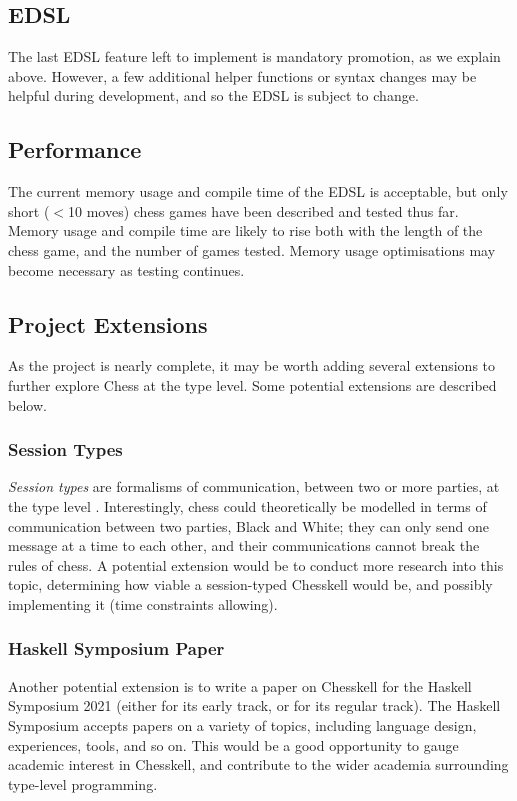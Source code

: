 \documentclass[12pt, a4paper, bibliography=totocnumbered]{scrartcl}
\begin{document}
\subsection{EDSL}

The last EDSL feature left to implement is mandatory promotion, as we explain above. However, a few additional helper functions or syntax changes may be helpful during development, and so the EDSL is subject to change.

\subsection{Performance}

The current memory usage and compile time of the EDSL is acceptable, but only short ($<$10 moves) chess games have been described and tested thus far. Memory usage and compile time are likely to rise both with the length of the chess game, and the number of games tested. Memory usage optimisations may become necessary as testing continues.

\subsection{Project Extensions}

As the project is nearly complete, it may be worth adding several extensions to further explore Chess at the type level. Some potential extensions are described below.

\subsubsection{Session Types}

\emph{Session types} are formalisms of communication, between two or more parties, at the type level \cite{torinosessions}. Interestingly, chess could theoretically be modelled in terms of communication between two parties, Black and White; they can only send one message at a time to each other, and their communications cannot break the rules of chess. A potential extension would be to conduct more research into this topic, determining how viable a session-typed Chesskell would be, and possibly implementing it (time constraints allowing).

\subsubsection{Haskell Symposium Paper}

Another potential extension is to write a paper on Chesskell for the Haskell Symposium 2021 (either for its early track, or for its regular track). The Haskell Symposium accepts papers on a variety of topics, including language design, experiences, tools, and so on. This would be a good opportunity to gauge academic interest in Chesskell, and contribute to the wider academia surrounding type-level programming.
\end{document}
